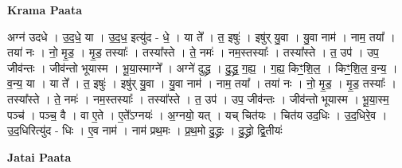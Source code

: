 \documentclass[17pt]{extarticle}
\begin{document}
\textbf{Krama Paata} \newline

अग्न॑ उदधे । उ॒द॒धे॒ या । उ॒द॒ध॒ इत्यु॑द - धे॒ । या ते᳚ । त॒ इषुः॑ । इषु॑र् यु॒वा । यु॒वा नाम॑ । नाम॒ तया᳚ । तया॑ नः । नो॒ मृ॒ड॒ । मृ॒ड॒ तस्याः᳚ । तस्या᳚स्ते । ते॒ नमः॑ । नम॒स्तस्याः᳚ । तस्या᳚स्ते । त॒ उप॑ । उप॒ जीव॑न्तः । जीव॑न्तो भूयास्म । भू॒या॒स्माग्ने᳚ । अग्ने॑ दुद्ध्र । दु॒द्ध्र॒ ग॒ह्य॒ । ग॒ह्य॒ किꣳ॒॒शि॒ल॒ । किꣳ॒॒शि॒ल॒ व॒न्य॒ । व॒न्य॒ या । या ते᳚ । त॒ इषुः॑ । इषु॑र् यु॒वा । यु॒वा नाम॑ । नाम॒ तया᳚ । तया॑ नः । नो॒ मृ॒ड॒ । मृ॒ड॒ तस्याः᳚ । तस्या᳚स्ते । ते॒ नमः॑ । नम॒स्तस्याः᳚ । तस्या᳚स्ते । त॒ उप॑ । उप॒ जीव॑न्तः । जीव॑न्तो भूयास्म । भू॒या॒स्म॒ पञ्च॑ । पञ्च॒ वै । वा ए॒ते । ए॒ते᳚ऽग्नयः॑ । अ॒ग्नयो॒ यत् । यच् चित॑यः । चित॑य उद॒धिः । उ॒द॒धिरे॒व । उ॒द॒धिरित्यु॑द - धिः । ए॒व नाम॑ । नाम॑ प्रथ॒मः । प्र॒थ॒मो दु॒द्ध्रः । दु॒द्ध्रो द्वि॒तीयः॑ \newline

\textbf{Jatai Paata} \newline
\end{document}
